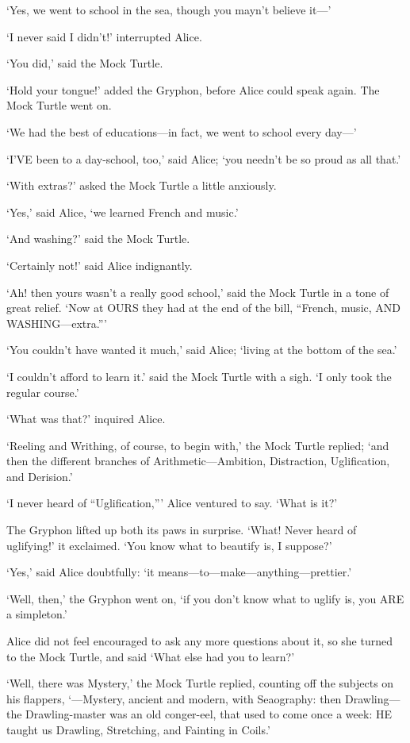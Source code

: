 \documentclass[12pt]{article}
\begin{document}
\begin{Parallel}[p]{}{}
{‘Yes, we went to school in the sea, though you mayn’t believe it—’

‘I never said I didn’t!’ interrupted Alice.

‘You did,’ said the Mock Turtle.

‘Hold your tongue!’ added the Gryphon, before Alice could speak again. The Mock Turtle went on.

‘We had the best of educations—in fact, we went to school every day—’

‘I’VE been to a day-school, too,’ said Alice; ‘you needn’t be so proud as all that.’

‘With extras?’ asked the Mock Turtle a little anxiously.

‘Yes,’ said Alice, ‘we learned French and music.’

‘And washing?’ said the Mock Turtle.

‘Certainly not!’ said Alice indignantly.

‘Ah! then yours wasn’t a really good school,’ said the Mock Turtle in a tone of great relief. ‘Now at OURS they had at the end of the bill, “French, music, AND WASHING—extra.”’

‘You couldn’t have wanted it much,’ said Alice; ‘living at the bottom of the sea.’

‘I couldn’t afford to learn it.’ said the Mock Turtle with a sigh. ‘I only took the regular course.’

‘What was that?’ inquired Alice.

‘Reeling and Writhing, of course, to begin with,’ the Mock Turtle replied; ‘and then the different branches of Arithmetic—Ambition, Distraction, Uglification, and Derision.’

‘I never heard of “Uglification,”’ Alice ventured to say. ‘What is it?’

The Gryphon lifted up both its paws in surprise. ‘What! Never heard of uglifying!’ it exclaimed. ‘You know what to beautify is, I suppose?’

‘Yes,’ said Alice doubtfully: ‘it means—to—make—anything—prettier.’

‘Well, then,’ the Gryphon went on, ‘if you don’t know what to uglify is, you ARE a simpleton.’

Alice did not feel encouraged to ask any more questions about it, so she turned to the Mock Turtle, and said ‘What else had you to learn?’

‘Well, there was Mystery,’ the Mock Turtle replied, counting off the subjects on his flappers, ‘—Mystery, ancient and modern, with Seaography: then Drawling—the Drawling-master was an old conger-eel, that used to come once a week: HE taught us Drawling, Stretching, and Fainting in Coils.’

}
\end{Parallel}
\end{document}

